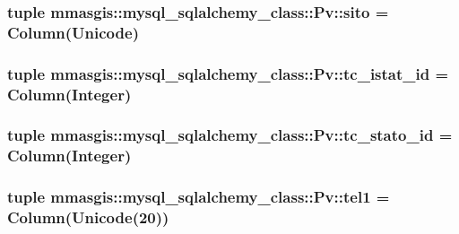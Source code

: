 \label{classmmasgis_1_1mysql__sqlalchemy__class_1_1Pv_a30f1175b6b3e41355f659cb5009579fe}
\hypertarget{classmmasgis_1_1mysql__sqlalchemy__class_1_1Pv_a67e469a7f2cda59394890c116bbc8450}{
\subsubsection[{sito}]{\setlength{\rightskip}{0pt plus 5cm}tuple {\bf mmasgis::mysql\_\-sqlalchemy\_\-class::Pv::sito} = Column(Unicode)}}
\label{classmmasgis_1_1mysql__sqlalchemy__class_1_1Pv_a67e469a7f2cda59394890c116bbc8450}
\hypertarget{classmmasgis_1_1mysql__sqlalchemy__class_1_1Pv_a8e70581cf222fdd20093e56cb85d3891}{
\subsubsection[{tc\_\-istat\_\-id}]{\setlength{\rightskip}{0pt plus 5cm}tuple {\bf mmasgis::mysql\_\-sqlalchemy\_\-class::Pv::tc\_\-istat\_\-id} = Column(Integer)}}
\label{classmmasgis_1_1mysql__sqlalchemy__class_1_1Pv_a8e70581cf222fdd20093e56cb85d3891}
\hypertarget{classmmasgis_1_1mysql__sqlalchemy__class_1_1Pv_a4ea13738df24a3f92a1957094f07fa57}{
\subsubsection[{tc\_\-stato\_\-id}]{\setlength{\rightskip}{0pt plus 5cm}tuple {\bf mmasgis::mysql\_\-sqlalchemy\_\-class::Pv::tc\_\-stato\_\-id} = Column(Integer)}}
\label{classmmasgis_1_1mysql__sqlalchemy__class_1_1Pv_a4ea13738df24a3f92a1957094f07fa57}
\hypertarget{classmmasgis_1_1mysql__sqlalchemy__class_1_1Pv_ad9a9351c352abf2b8a07dcde54f37408}{
\subsubsection[{tel1}]{\setlength{\rightskip}{0pt plus 5cm}tuple {\bf mmasgis::mysql\_\-sqlalchemy\_\-class::Pv::tel1} = Column(Unicode(20))}}
